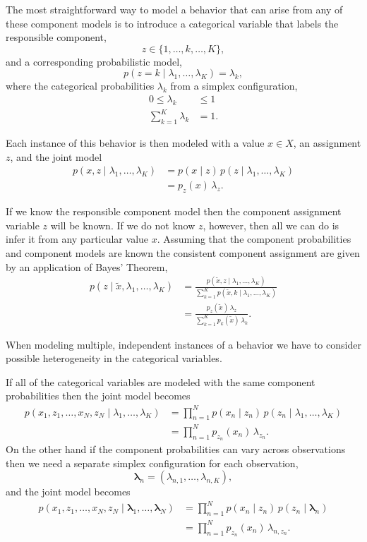 \documentclass[
  letterpaper,
  DIV=11,
  numbers=noendperiod]{scrartcl}
\begin{document}
The most straightforward way to model a behavior that can arise from any
of these component models is to introduce a categorical variable that
labels the responsible component, \[
z \in \{ 1, \ldots, k, \ldots, K \},
\] and a corresponding probabilistic model, \[
p(z = k \mid \lambda_{1}, \ldots, \lambda_{K}) = \lambda_{k},
\] where the categorical probabilities \(\lambda_{k}\) from a simplex
configuration, \begin{align*}
0 \le \lambda_{k} &\le 1
\\
\sum_{k = 1}^{K} \lambda_{k} &= 1.
\end{align*}

Each instance of this behavior is then modeled with a value \(x \in X\),
an assignment \(z\), and the joint model \begin{align*}
p(x, z \mid \lambda_{1}, \ldots, \lambda_{K})
&=
p(x \mid z) \, p(z \mid \lambda_{1}, \ldots, \lambda_{K})
\\
&=
p_{z}(x) \, \lambda_{z}.
\end{align*}

If we know the responsible component model then the component assignment
variable \(z\) will be known. If we do not know \(z\), however, then all
we can do is infer it from any particular value \(x\). Assuming that the
component probabilities and component models are known the consistent
component assignment are given by an application of Bayes' Theorem,
\begin{align*}
p(z \mid \tilde{x}, \lambda_{1}, \ldots, \lambda_{K})
&=
\frac{
  p(\tilde{x}, z \mid \lambda_{1}, \ldots, \lambda_{K})
}{
  \sum_{k = 1}^{K} p(\tilde{x}, k \mid \lambda_{1}, \ldots, \lambda_{K})
}
\\
&=
\frac{ p_{z}(\tilde{x}) \, \lambda_{z}}
{ \sum_{k = 1}^{K} p_{k}(\tilde{x}) \, \lambda_{k} }.
\end{align*}

When modeling multiple, independent instances of a behavior we have to
consider possible heterogeneity in the categorical variables.

If all of the categorical variables are modeled with the same component
probabilities then the joint model becomes \begin{align*}
p(x_{1}, z_{1}, \ldots, x_{N}, z_{N} \mid
  \lambda_{1}, \ldots, \lambda_{K})
&=
\prod_{n = 1}^{N}
p(x_{n} \mid z_{n}) \, p(z_{n} \mid \lambda_{1}, \ldots, \lambda_{K})
\\
&=
\prod_{n = 1}^{N}
p_{z_{n}}(x_{n}) \, \lambda_{z_{n}}.
\end{align*} On the other hand if the component probabilities can vary
across observations then we need a separate simplex configuration for
each observation, \[
\boldsymbol{\lambda}_{n} = ( \lambda_{n, 1}, \ldots, \lambda_{n, K}),
\] and the joint model becomes \begin{align*}
p(x_{1}, z_{1}, \ldots, x_{N}, z_{N} \mid
  \boldsymbol{\lambda}_{1}, \ldots, \boldsymbol{\lambda}_{N})
&=
\prod_{n = 1}^{N}
p(x_{n} \mid z_{n}) \, p(z_{n} \mid \boldsymbol{\lambda}_{n})
\\
&=
\prod_{n = 1}^{N}
p_{z_{n}}(x_{n}) \, \lambda_{n, z_{n}}.
\end{align*}
\end{document}
